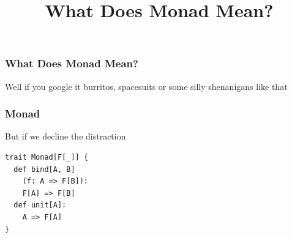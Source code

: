{


  \begin{frame}[plain] 
  \title{What Does Monad Mean?}
  
  \vspace{3em}

  \begin{TitleBoxWhatDoesMonadMean}
    \begin{center}
    {\Large \inserttitle}
    \end{center}
  \end{TitleBoxWhatDoesMonadMean}

  \end{frame}
}


\begin{frame}
\frametitle{What Does Monad Mean?}
\begin{block}{Well if you google it}
burritos, spacesuits or some silly shenanigans like that
\end{block}
\end{frame}


\begin{frame}[fragile]
\frametitle{Monad}
\begin{block}{But if we decline the distraction}
\begin{lstlisting}[style=scala,mathescape]
trait Monad[F[_]] {
  def bind[A, B]
    (f: A => F[B]):
    F[A] => F[B]
  def unit[A]:
    A => F[A]
}
\end{lstlisting}
\end{block}
\end{frame}


